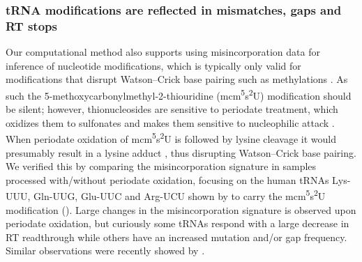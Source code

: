 \documentclass[9pt,lineno]{elife}
\begin{document}
\subsubsection{tRNA modifications are reflected in mismatches, gaps and RT stops}
Our computational method also supports using misincorporation data for inference of nucleotide modifications, which is typically only valid for modifications that disrupt Watson–Crick base pairing such as methylations \citep{Clark2016-ph, Behrens2021-gb}.
As such the 5-methoxycarbonylmethyl-2-thiouridine (mcm\textsuperscript{5}s\textsuperscript{2}U) modification should be silent; however, thionucleosides are sensitive to periodate treatment, which oxidizes them to sulfonates and makes them sensitive to nucleophilic attack \citep{Ziff1968-la, Rao1974-zq}.
When periodate oxidation of mcm\textsuperscript{5}s\textsuperscript{2}U is followed by lysine cleavage it would presumably result in a lysine adduct \citep{Ziff1968-la}, thus disrupting Watson–Crick base pairing.
We verified this by comparing the misincorporation signature in samples processed with/without periodate oxidation, focusing on the human tRNAs Lys-UUU, Gln-UUG, Glu-UUC and Arg-UCU shown by \cite{Lentini2018-xs} to carry the mcm\textsuperscript{5}s\textsuperscript{2}U modification ().
Large changes in the misincorporation signature is observed upon periodate oxidation, but curiously some tRNAs respond with a large decrease in RT readthrough while others have an increased mutation and/or gap frequency.
Similar observations were recently showed by \cite{Katanski2022-ij}.
\end{document}
